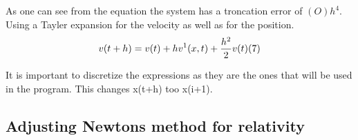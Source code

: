 \documentclass{article}
\begin{document}
    As one can see from the equation the system has a troncation error of $(O)h^{4}$.
    Using a Tayler expansion for the velocity as well as for the position. \\

    \begin{equation}    \label{eq:velocityfinal}
        v(t+h) = v(t) + h v^{1}(x,t) + \frac{h^{2}}{2}v(t) (7) \\
    \end{equation}

    It is important to discretize the expressions as they are the ones that will be used in the program. This changes x(t+h) too x(i+1). \\



\subsection{Adjusting Newtons method for relativity}








\end{document}
